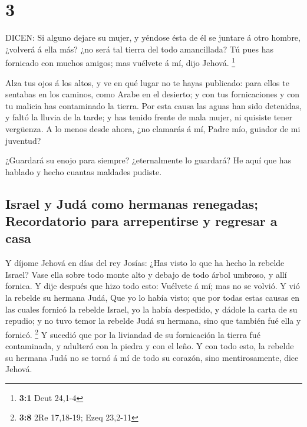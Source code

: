\hypertarget{section-2}{%
\section{3}\label{section-2}}

 DICEN: Si alguno dejare su mujer, y yéndose ésta de él se
juntare á otro hombre, ¿volverá á ella más? ¿no será tal tierra del todo
amancillada? Tú pues has fornicado con muchos amigos; mas vuélvete á mí,
dijo Jehová. \footnote{\textbf{3:1} Deut 24,1-4}

 Alza tus ojos á los altos, y ve en qué lugar no te hayas
publicado: para ellos te sentabas en los caminos, como Arabe en el
desierto; y con tus fornicaciones y con tu malicia has contaminado la
tierra.  Por esta causa las aguas han sido detenidas, y
faltó la lluvia de la tarde; y has tenido frente de mala mujer, ni
quisiste tener vergüenza.  A lo menos desde ahora, ¿no
clamarás á mí, Padre mío, guiador de mi juventud?

 ¿Guardará su enojo para siempre? ¿eternalmente lo guardará?
He aquí que has hablado y hecho cuantas maldades pudiste.

\hypertarget{israel-y-juduxe1-como-hermanas-renegadas-recordatorio-para-arrepentirse-y-regresar-a-casa}{%
\subsection{Israel y Judá como hermanas renegadas; Recordatorio para
arrepentirse y regresar a
casa}\label{israel-y-juduxe1-como-hermanas-renegadas-recordatorio-para-arrepentirse-y-regresar-a-casa}}

 Y díjome Jehová en días del rey Josías: ¿Has visto lo que
ha hecho la rebelde Israel? Vase ella sobre todo monte alto y debajo de
todo árbol umbroso, y allí fornica.  Y dije después que hizo
todo esto: Vuélvete á mí; mas no se volvió. Y vió la rebelde su hermana
Judá,  Que yo lo había visto; que por todas estas causas en
las cuales fornicó la rebelde Israel, yo la había despedido, y dádole la
carta de su repudio; y no tuvo temor la rebelde Judá su hermana, sino
que también fué ella y fornicó. \footnote{\textbf{3:8} 2Re 17,18-19;
  Ezeq 23,2-11}  Y sucedió que por la liviandad de su
fornicación la tierra fué contaminada, y adulteró con la piedra y con el
leño.  Y con todo esto, la rebelde su hermana Judá no se
tornó á mí de todo su corazón, sino mentirosamente, dice Jehová.

